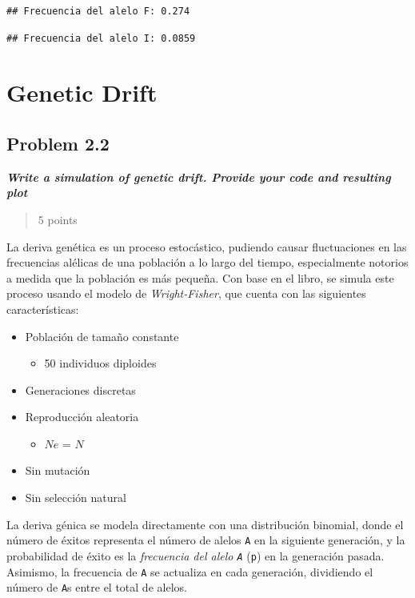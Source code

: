 \documentclass[
  11pt,
]{article}
\providecommand{\tightlist}{%
  \setlength{\itemsep}{0pt}\setlength{\parskip}{0pt}}
\begin{document}
\begin{verbatim}
## Frecuencia del alelo F: 0.274
\end{verbatim}

\begin{verbatim}
## Frecuencia del alelo I: 0.0859
\end{verbatim}

\section{Genetic Drift}\label{genetic-drift}

\subsection{Problem 2.2}\label{problem-2.2}

\textbf{\emph{Write a simulation of genetic drift. Provide your code and
resulting plot}}

\begin{quote}
5 points
\end{quote}

La deriva genética es un proceso estocástico, pudiendo causar
fluctuaciones en las frecuencias alélicas de una población a lo largo
del tiempo, especialmente notorios a medida que la población es más
pequeña. Con base en el libro, se simula este proceso usando el modelo
de \emph{Wright-Fisher}, que cuenta con las siguientes características:

\begin{itemize}
\item
  Población de tamaño constante

  \begin{itemize}
  \tightlist
  \item
    50 individuos diploides
  \end{itemize}
\item
  Generaciones discretas
\item
  Reproducción aleatoria

  \begin{itemize}
  \tightlist
  \item
    \(Ne\) = \(N\)
  \end{itemize}
\item
  Sin mutación
\item
  Sin selección natural
\end{itemize}

La deriva génica se modela directamente con una distribución binomial,
donde el número de éxitos representa el número de alelos \texttt{A} en
la siguiente generación, y la probabilidad de éxito es la
\emph{frecuencia del alelo \texttt{A}} (\texttt{p}) en la generación
pasada. Asimismo, la frecuencia de \texttt{A} se actualiza en cada
generación, dividiendo el número de \texttt{A}s entre el total de
alelos.
\end{document}
